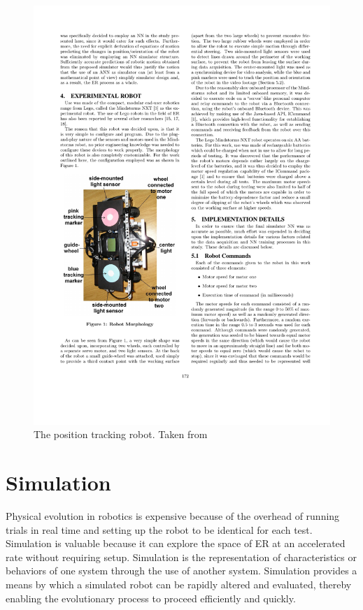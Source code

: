 \documentclass{sig-alternate}
\begin{document}
\begin{figure}%
  \includegraphics[scale=.65]{cr1}
\caption{The position tracking robot. Taken from ~\cite{Pretorius:2009:TAN:1632149.1632171}}
\label{fig:pRobot}
\end{figure}
	
\section{Simulation}\label{simulation}
Physical evolution in robotics is expensive because of the overhead of running trials in real time and setting up the robot to be identical for each test. Simulation is valuable because it can explore the space of ER at an accelerated rate without requiring setup. Simulation is the representation of characteristics or behaviors of one system through the use of another system. Simulation provides a means by which a simulated robot can be rapidly altered and evaluated, thereby enabling the evolutionary process to proceed efficiently and quickly.
\end{document}
